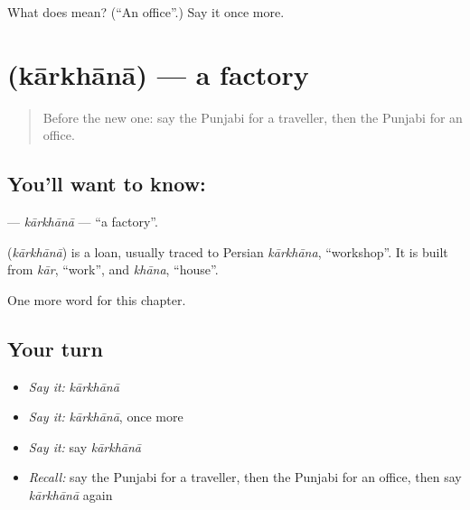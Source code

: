 \begin{tcolorbox}[breakable,colback=teal!4,colframe=teal!35!black,title={Before you move on}]
What does  mean? (\textquotedblleft{}An office\textquotedblright{}.) Say it once more.
\end{tcolorbox}
\section[\texorpdfstring{\pa{ਕਾਰਖ਼ਾਨਾ} (kārkhānā)}{ਕਾਰਖ਼ਾਨਾ (kārkhānā)}]{ (kārkhānā) — a factory}

\label{lesson:PA-C137-karkhana}



\begin{quote}
Before the new one: say the Punjabi for a traveller, then the Punjabi for an office.
\end{quote}

\subsection*{You'll want to know: }
\textbf{} — \emph{kārkhānā} — \textquotedblleft{}a factory\textquotedblright{}.

\begin{cousinweb}
\textbf{} (\emph{kārkhānā}) is a loan, usually traced to Persian \emph{kārkhāna}, \textquotedblleft{}workshop\textquotedblright{}. It is built from \emph{kār}, \textquotedblleft{}work\textquotedblright{}, and \emph{khāna}, \textquotedblleft{}house\textquotedblright{}.
\end{cousinweb}

\begin{grammarlens}[title={What you've built}]
One more word for this chapter.
\end{grammarlens}

\subsection*{Your turn}
\begin{itemize}
\raggedright
  \item \emph{Say it:} \emph{kārkhānā}
  \item \emph{Say it:} \emph{kārkhānā}, once more
  \item \emph{Say it:} say \emph{kārkhānā}
  \item \emph{Recall:} say the Punjabi for a traveller, then the Punjabi for an office, then say \emph{kārkhānā} again
\end{itemize}

